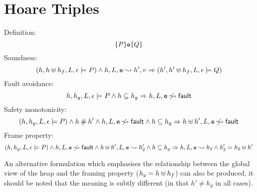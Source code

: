 \documentclass[a4paper,notitlepage]{report}
\begin{document}
\section{Hoare Triples}
Definition:
\[ \{P\}\mathtt{e}\{Q\} \]
Soundness:
\[ (h, h \uplus h_f, L, \epsilon \models P) \land h, L, \mathtt{e} \leadsto h', v
  \Rightarrow (h', h' \uplus h_f, L, \epsilon \models Q) \]
Fault avoidance:
\[ h, h_g, L, \epsilon \models P \land h\subseteq h_g \Rightarrow h, L, \mathtt{e} \not\leadsto {\ensuremath{\mathsf{fault}}} \]
Safety monotonicity:
\[ (h, h_g, L, \epsilon \models P) \land h \mathbin{\#} h' \land h, L, \mathtt{e} \not\leadsto
  {\ensuremath{\mathsf{fault}}} \land h\subseteq h_g \Rightarrow h \uplus h', L, \mathtt{e} \not\leadsto {\ensuremath{\mathsf{fault}}} \]
Frame property:
\[ (h, h_g, L, \epsilon \models P) \land h, L, \mathtt{e} \not\leadsto {\ensuremath{\mathsf{fault}}} \land
  h \uplus h', L, \mathtt{e} \leadsto h_2' \land h\subseteq h_g\Rightarrow h, L, \mathtt{e} \leadsto h_2 \land
  h_2' = h_2 \uplus h' \]

An alternative formulation which emphasises the relationship between the global
view of the heap and the framing property ($h_g = h \uplus h_f$) can also be
produced, it should be noted that the meaning is subtly different (in that $h'
\neq h_g$ in all cases).
\end{document}
